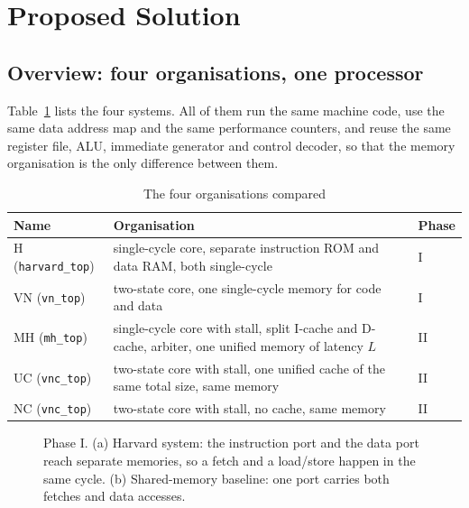 \documentclass[conference]{IEEEtran}
\begin{document}
\section{Proposed Solution}

\subsection{Overview: four organisations, one processor}
Table~\ref{tab:systems} lists the four systems. All of them run the same
machine code, use the same data address map and the same performance
counters, and reuse the same register file, ALU, immediate generator and
control decoder, so that the memory organisation is the only difference
between them.

\begin{table}[t]
\caption{The four organisations compared}
\label{tab:systems}
\centering
\footnotesize
\setlength{\tabcolsep}{3pt}
\begin{tabularx}{\columnwidth}{@{}>{\raggedright\arraybackslash}p{}>{\raggedright\arraybackslash}X>{\raggedright\arraybackslash}p{}@{}}
\toprule
Name & Organisation & Phase \\
\midrule
H (\texttt{harvard\_top}) & single-cycle core, separate instruction ROM and data RAM, both single-cycle & I \\
VN (\texttt{vn\_top}) & two-state core, one single-cycle memory for code and data & I \\
MH (\texttt{mh\_top}) & single-cycle core with stall, split I-cache and D-cache, arbiter, one unified memory of latency $L$ & II \\
UC (\texttt{vnc\_top}) & two-state core with stall, one unified cache of the same total size, same memory & II \\
NC (\texttt{vnc\_top}) & two-state core with stall, no cache, same memory & II \\
\bottomrule
\end{tabularx}
\end{table}

\begin{figure}[t]
\centering

\caption{Phase I. (a) Harvard system: the instruction port and the data port reach separate memories, so a fetch and a load/store happen in the same cycle. (b) Shared-memory baseline: one port carries both fetches and data accesses.}
\label{fig:block}
\end{figure}
\end{document}
